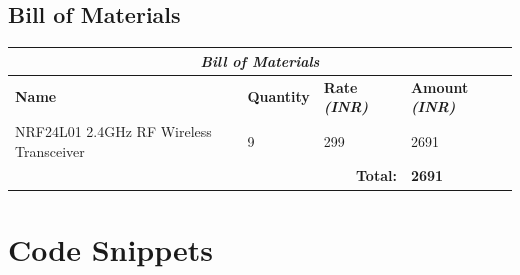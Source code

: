 \documentclass{article}
\begin{document}
\subsection{Bill of Materials\label{BOM}}

\begin{tabular}{ |p{7cm}|p{2cm}|p{3cm}|p{3cm}|  }
 \hline
 \multicolumn{4}{|c|}{\textbf{\textit{Bill of Materials}}} \\
 \hline
 \hline
 \textbf{Name} & \textbf{Quantity} & \textbf{Rate \textit{(INR)}} & \textbf{Amount \textit{(INR)}}\\
 \hline
 \hline
 NRF24L01 2.4GHz RF Wireless Transceiver & 9 & 299 & 2691 \\ \hline
 \hline
 \multicolumn{3}{|r|}{\textbf{Total: }} & \textbf{2691} \\ \hline
\end{tabular}

\printbibliography[heading=bibintoc]


\appendix

\section{Code Snippets }\label{appendix:code}
\end{document}
